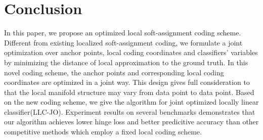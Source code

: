 \documentclass{llncs}
\begin{document}
	\section{Conclusion}
	In this paper, we propose an optimized local soft-assignment coding scheme. Different from existing localized soft-assignment coding, we formulate a joint optimization over anchor points, local coding coordinates and classifiers' variables by minimizing the distance of local approximation to the ground truth. In this novel coding scheme, the anchor points and corresponding local coding coordinates are optimized in a joint way. This design gives full consideration to that the local manifold structure may vary from data point to data point. Based on the new coding scheme, we give the algorithm for joint optimized locally linear classifier(LLC-JO). Experiment results on several benchmarks demonstrates that our algorithm achieves lower hinge loss and better predicitive accuracy than other competitive methods which employ a fixed local coding scheme.
\end{document}
